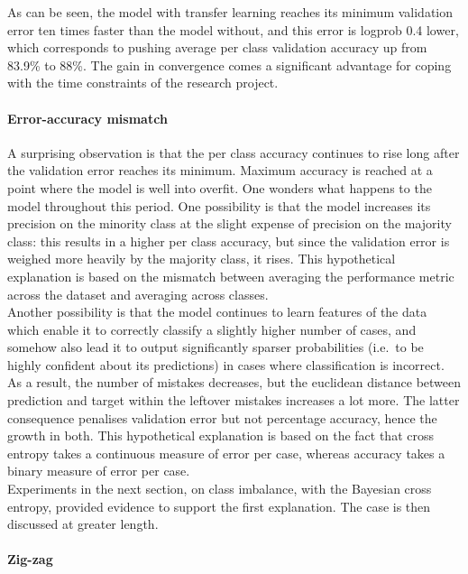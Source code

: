 \documentclass[a4paper,11pt]{article}
\begin{document}
As can be seen, the model with transfer learning reaches its minimum validation error ten times faster than the model without, and this error is logprob 0.4 lower, which corresponds to pushing average per class validation accuracy up from 83.9\% to 88\%. The gain in convergence comes a significant advantage for coping with the time constraints of the research project. 

\paragraph{Error-accuracy mismatch}

A surprising observation is that the per class accuracy continues to rise long after the validation error reaches its minimum. Maximum accuracy is reached at a point where the model is well into overfit. One wonders what happens to the model throughout this period. One possibility is that the model increases its precision on the minority class at the slight expense of precision on the majority class: this results in a higher per class accuracy, but since the validation error is weighed more heavily by the majority class, it rises. This hypothetical explanation is based on the mismatch between averaging the performance metric across the dataset and averaging across classes. \\

Another possibility is that the model continues to learn features of the data which enable it to correctly classify a slightly higher number of cases, and somehow also lead it to output significantly sparser probabilities (i.e.\ to be highly confident about its predictions) in cases where classification is incorrect. As a result, the number of mistakes decreases, but the euclidean distance between prediction and target within the leftover mistakes increases a lot more. The latter consequence penalises validation error but not percentage accuracy, hence the growth in both. This hypothetical explanation is based on the fact that cross entropy takes a continuous measure of error per case, whereas accuracy takes a binary measure of error per case. \\

Experiments in the next section, on class imbalance, with the Bayesian cross entropy, provided evidence to support the first explanation. The case is then discussed at greater length.

\paragraph{Zig-zag}
\end{document}
